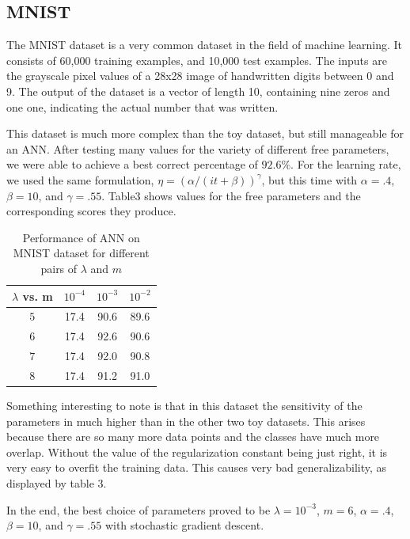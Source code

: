 \documentclass[12pt, twocolumn]{article}
\begin{document}
\subsection{MNIST}

The MNIST dataset is a very common dataset in the field of machine learning. It consists of 60,000 training examples, and 10,000 test examples. The inputs are the grayscale pixel values of a 28x28 image of handwritten digits between 0 and 9. The output of the dataset is a vector of length 10, containing nine zeros and one one, indicating the actual number that was written.

This dataset is much more complex than the toy dataset, but still manageable for an ANN. After testing many values for the variety of different free parameters, we were able to achieve a best correct percentage of $92.6\%$. For the learning rate, we used the same formulation, $\eta = (\alpha/(it + \beta))^\gamma$, but this time with $\alpha = .4$, $\beta = 10$, and $\gamma = .55$. Table3 shows values for the free parameters and the corresponding scores they produce.

\begin{center}
\begin{table}
  \begin{tabular}{ | c | c | c | c | }
    \hline
     $\lambda$ vs. m & $10^{-4}$ & $10^{-3}$ & $10^{-2}$ \\ \hline
     $5$ & 17.4 & 90.6 & 89.6 \\ \hline
     $6$ & 17.4 & 92.6 & 90.6 \\ \hline
     $7$ & 17.4 & 92.0 & 90.8 \\ \hline
     $8$ & 17.4 & 91.2 & 91.0 \\ \hline
    \hline
  \end{tabular}
  \caption{Performance of ANN on MNIST dataset for different pairs of $\lambda$ and $m$}
  \end{table}
\end{center}

Something interesting to note is that in this dataset the sensitivity of the parameters in much higher than in the other two toy datasets. This arises because there are so many more data points and the classes have much more overlap. Without the value of the regularization constant being just right, it is very easy to overfit the training data. This causes very bad generalizability, as displayed by table 3. 

In the end, the best choice of parameters proved to be $\lambda = 10^{-3}$, $m=6$, $\alpha = .4$, $\beta = 10$, and $\gamma = .55$ with stochastic gradient descent.

 
\end{document}
